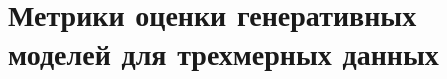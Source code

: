 \section{Метрики оценки генеративных моделей для трехмерных данных} \label{section:metrics-evaluation}

